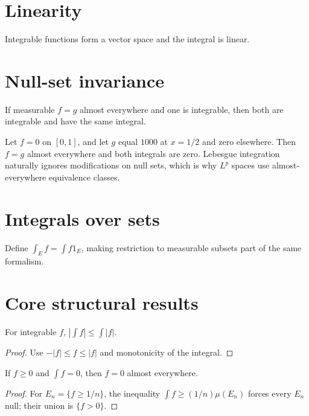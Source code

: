 \section{Linearity}
Integrable functions form a vector space and the integral is linear.

\section{Null-set invariance}
If measurable $f=g$ almost everywhere and one is integrable, then both are integrable and have the same integral.


\begin{example}\label{ex:iii03-expand-03}
Let \(f=0\) on \([0,1]\), and let \(g\) equal \(1000\) at \(x=1/2\) and
zero elsewhere. Then \(f=g\) almost everywhere and both integrals are zero.
Lebesgue integration naturally ignores modifications on null sets, which is why
\(L^p\) spaces use almost-everywhere equivalence classes.
\end{example}
\section{Integrals over sets}
Define $\int_Ef=\int f1_E$, making restriction to measurable subsets part of the same formalism.

\section{Core structural results}

\begin{theorem}\label{thm:iii03-01}
For integrable $f$, $|\int f|\le\int|f|$.
\begin{proof}
Use $-|f|\le f\le|f|$ and monotonicity of the integral.
\end{proof}
\end{theorem}

\begin{theorem}\label{thm:iii03-02}
If $f\ge0$ and $\int f=0$, then $f=0$ almost everywhere.
\begin{proof}
For $E_n=\{f\ge1/n\}$, the inequality $\int f\ge(1/n)\mu(E_n)$ forces every $E_n$ null; their union is $\{f>0\}$.
\end{proof}
\end{theorem}

